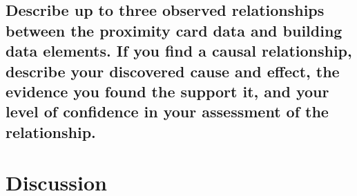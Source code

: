 \documentclass[aps, 10pt, a4paper]{article}
\begin{document}
        \subsection[Question 4]{Describe up to three observed relationships between the proximity card data and building data elements. If you find a causal relationship, describe your discovered cause and effect, the evidence you found the support it, and your level of confidence in your assessment of the relationship.}
    
    \section{Discussion}
    
    
    
\end{document}
